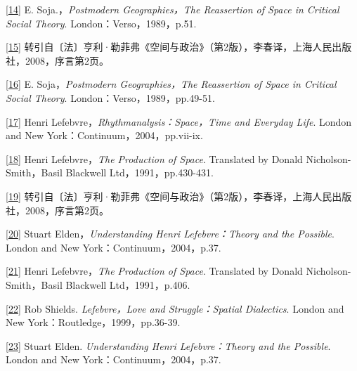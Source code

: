 \documentclass[UTF8, fontset = sourcesans, a4paper, oneside, zihao =
-4, scheme=chinese, no-math, space=true]{ctexbook}
\begin{document}
\protect\hypertarget{part0004.htmlux5cux23m14}{}{}\protect\hyperlink{part0004.htmlux5cux23w14}{{[}14{]}}
E. Soja.，\emph{Postmodern Geographies，The Reassertion of Space in
Critical Social Theory}. London：Verso，1989，p.51.

\protect\hypertarget{part0004.htmlux5cux23m15}{}{}\protect\hyperlink{part0004.htmlux5cux23w15}{{[}15{]}}
转引自〔法〕亨利·勒菲弗《空间与政治》（第2版），李春译，上海人民出版社，2008，序言第2页。

\protect\hypertarget{part0004.htmlux5cux23m16}{}{}\protect\hyperlink{part0004.htmlux5cux23w16}{{[}16{]}}
E. Soja，\emph{Postmodern Geographies，The Reassertion of Space in
Critical Social Theory}. London：Verso，1989，pp.49-51.

\protect\hypertarget{part0004.htmlux5cux23m17}{}{}\protect\hyperlink{part0004.htmlux5cux23w17}{{[}17{]}}
Henri Lefebvre，\emph{Rhythmanalysis：Space，Time and Everyday Life}.
London and New York：Continuum，2004，pp.vii-ix.

\protect\hypertarget{part0004.htmlux5cux23m18}{}{}\protect\hyperlink{part0004.htmlux5cux23w18}{{[}18{]}}
Henri Lefebvre，\emph{The Production of Space}. Translated by Donald
Nicholson-Smith，Basil Blackwell Ltd，1991，pp.430-431.

\protect\hypertarget{part0004.htmlux5cux23m19}{}{}\protect\hyperlink{part0004.htmlux5cux23w19}{{[}19{]}}
转引自〔法〕亨利·勒菲弗《空间与政治》（第2版），李春译，上海人民出版社，2008，序言第2页。

\protect\hypertarget{part0004.htmlux5cux23m20}{}{}\protect\hyperlink{part0004.htmlux5cux23w20}{{[}20{]}}
Stuart Elden，\emph{Understanding Henri Lefebvre：Theory and the
Possible}. London and New York：Continuum，2004，p.37.

\protect\hypertarget{part0004.htmlux5cux23m21}{}{}\protect\hyperlink{part0004.htmlux5cux23w21}{{[}21{]}}
Henri Lefebvre，\emph{The Production of Space}. Translated by Donald
Nicholson-Smith，Basil Blackwell Ltd，1991，p.406.

\protect\hypertarget{part0004.htmlux5cux23m22}{}{}\protect\hyperlink{part0004.htmlux5cux23w22}{{[}22{]}}
Rob Shields. \emph{Lefebvre，Love and Struggle：Spatial Dialectics}.
London and New York：Routledge，1999，pp.36-39.

\protect\hypertarget{part0004.htmlux5cux23m23}{}{}\protect\hyperlink{part0004.htmlux5cux23w23}{{[}23{]}}
Stuart Elden. \emph{Understanding Henri Lefebvre：Theory and the
Possible}. London and New York：Continuum，2004，p.37.
\end{document}
